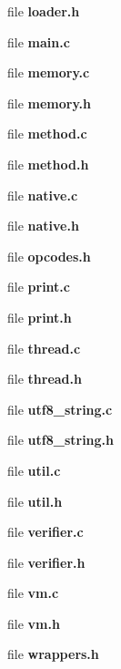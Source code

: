 \begin{DoxyCompactItemize}
\item 
file {\bf loader.h}
\item 
file {\bfseries main.c}
\item 
file {\bf memory.c}
\item 
file {\bf memory.h}
\item 
file {\bf method.c}
\item 
file {\bf method.h}
\item 
file {\bf native.c}
\item 
file {\bf native.h}
\item 
file {\bfseries opcodes.h}
\item 
file {\bf print.c}
\item 
file {\bf print.h}
\item 
file {\bf thread.c}
\item 
file {\bf thread.h}
\item 
file {\bf utf8\_\-string.c}
\item 
file {\bf utf8\_\-string.h}
\item 
file {\bfseries util.c}
\item 
file {\bf util.h}
\item 
file {\bf verifier.c}
\item 
file {\bf verifier.h}
\item 
file {\bf vm.c}
\item 
file {\bf vm.h}
\item 
file {\bfseries wrappers.h}
\end{DoxyCompactItemize}
